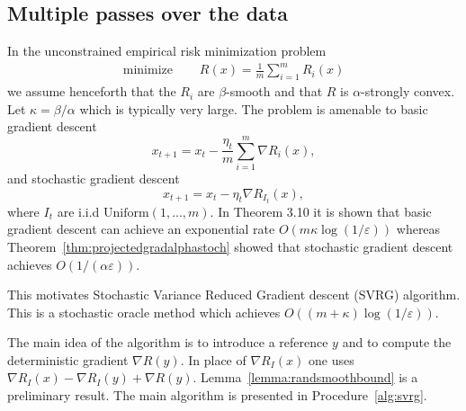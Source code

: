 \subsection{Multiple passes over the data}
In the unconstrained empirical risk minimization problem
\begin{align*}
	\text{minimize }\quad   & R(x) = \frac{1}{m}\sum_{i=1}^m R_i(x)
\end{align*}
we assume henceforth that the $R_i$ are $\beta$-smooth and that $R$ is $\alpha$-strongly convex. Let $\kappa = \beta/\alpha$ which is typically very large. The problem is amenable to basic gradient descent
\begin{equation}
	x_{t+1}= x_t - \frac{\eta_t}{m}\sum_{i=1}^m \nabla R_i(x),
\end{equation}
and stochastic gradient descent
\begin{equation}
	x_{t+1}= x_t - \eta_t \nabla R_{I_t}(x),
\end{equation}
where $I_t$ are i.i.d $\text{Uniform}(1, ..., m)$. In \cite{bubeck} Theorem 3.10 it is shown that basic gradient descent can achieve an exponential rate $O(m\kappa\log(1/\varepsilon))$ whereas Theorem~\ref{thm:projectedgradalphastoch} showed that stochastic gradient descent achieves $O(1/(\alpha\varepsilon))$.

This motivates Stochastic Variance Reduced Gradient descent (SVRG) algorithm. This is a stochastic oracle method which achieves $O((m+\kappa)\log(1/\varepsilon))$.

The main idea of the algorithm is to introduce a reference $y$ and to compute the deterministic gradient $\nabla R(y)$. In place of $\nabla R_I(x)$ one uses $\nabla R_I(x) - \nabla R_I(y) + \nabla R(y)$. Lemma~\ref{lemma:randsmoothbound} is a preliminary result. The main algorithm is presented in Procedure~\ref{alg:svrg}.

